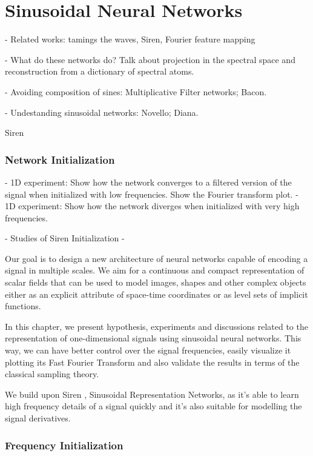 \chapter{Sinusoidal Neural Networks}

- Related works: tamings the waves, Siren, Fourier feature mapping

- What do these networks do? Talk about projection in the spectral space and reconstruction from a dictionary of spectral atoms.

- Avoiding composition of sines: Multiplicative Filter networks; Bacon.

- Undestanding sinusoidal networks: Novello; Diana.


Siren \cite{sitzmann2019siren} 


\subsection{Network Initialization}

- 1D experiment: Show how the network converges to a filtered version of the signal when initialized with low frequencies. Show the Fourier transform plot.
- 1D experiment: Show how the network diverges when initialized with very high frequencies.

- Studies of Siren Initialization
- 


Our goal is to design a new architecture of neural networks capable of encoding a signal in multiple scales. We aim for a continuous and compact representation of scalar fields that can be used to model images, shapes and other complex objects either as an explicit attribute of space-time coordinates or as level sets of implicit functions.

In this chapter, we present hypothesis, experiments and discussions related to the representation of one-dimensional signals using sinusoidal neural networks. This way, we can have better control over the signal frequencies, easily visualize it plotting its Fast Fourier Transform and also validate the results in terms of the classical sampling theory. 

We build upon Siren \cite{sitzmann2019siren}, Sinusoidal Representation Networks, as it's able to learn high frequency details of a signal quickly and it's also suitable for modelling the signal derivatives.

\subsection{Frequency Initialization}


